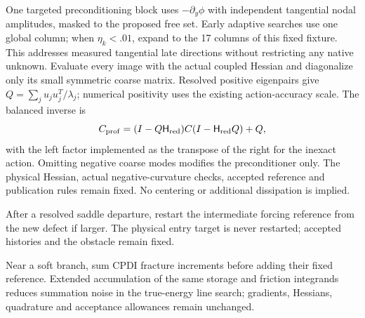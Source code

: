 \documentclass[11pt,a4paper]{article}
\begin{document}
One targeted preconditioning block uses $-\partial_y\phi$ with independent
tangential nodal amplitudes, masked to the proposed free set. Early adaptive
searches use one global column; when $\eta_k<.01$, expand to the 17 columns of
this fixed fixture. This addresses measured tangential late directions without
restricting any native unknown. Evaluate every image with the actual coupled
Hessian and diagonalize only its small symmetric coarse matrix. Resolved positive
eigenpairs give $Q=\sum_j u_ju_j^T/\lambda_j$; numerical positivity uses the
existing action-accuracy scale. The balanced inverse is
\[
 C_{\rm prof}=(I-Q\mathsf H_{\rm red})C(I-\mathsf H_{\rm red}Q)+Q,
\]
with the left factor implemented as the transpose of the right for the inexact
action. Omitting negative coarse modes modifies the preconditioner only. The
physical Hessian, actual negative-curvature checks, accepted reference and
publication rules remain fixed. No centering or additional dissipation is implied.

After a resolved saddle departure, restart the intermediate forcing reference
from the new defect if larger. The physical entry target is never restarted;
accepted histories and the obstacle remain fixed.

Near a soft branch, sum CPDI fracture increments before adding their fixed
reference. Extended accumulation of the same storage and friction integrands
reduces summation noise in the true-energy line search; gradients, Hessians,
quadrature and acceptance allowances remain unchanged.
\end{document}
